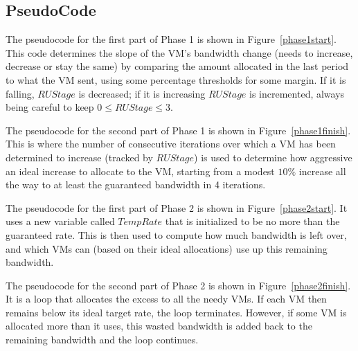 \subsection{PseudoCode}

The pseudocode for the first part of Phase 1 is shown in
Figure~\ref{phase1start}. This code determines the slope of the VM's bandwidth
change (needs to increase, decrease or stay the same) by comparing the amount
allocated in the last period to what the VM sent, using some percentage
thresholds for some margin.  If it is falling, $RUStage$ is decreased; if it is
increasing $RUStage$ is incremented, always being careful to keep $0 \leq
RUStage \leq 3$. 

The pseudocode for the second part of Phase 1 is shown in
Figure~\ref{phase1finish}.  This is where the number of consecutive iterations
over which a VM has been determined to increase (tracked by $RUStage$) is used
to determine how aggressive an ideal increase to allocate to the VM, starting
from a modest $10\%$ increase all the way to at least the guaranteed bandwidth
in 4 iterations.

The pseudocode for the first part of Phase 2 is shown in
Figure~\ref{phase2start}.  It uses a new variable called $TempRate$ that is
initialized to be no more than the guaranteed rate.   This is then used to
compute how much bandwidth is left over, and which VMs can (based on their ideal
allocations) use up this remaining bandwidth.

The pseudocode for the second part of Phase 2 is shown in
Figure~\ref{phase2finish}.   It is a loop that allocates the excess to all the
needy VMs. If each VM then remains below its ideal target rate, the loop
terminates.  However, if some VM is allocated more than it uses, this wasted
bandwidth is added back to the remaining bandwidth and the loop continues.


